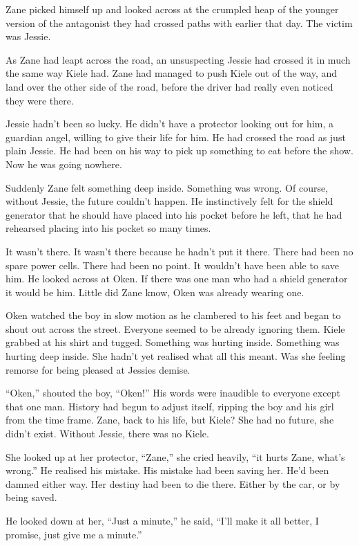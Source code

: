 Zane picked himself up and looked across at the crumpled heap of the younger version of the antagonist they had crossed paths with earlier that day.  The victim was Jessie.

As Zane had leapt across the road, an unsuspecting Jessie had crossed it in much the same way Kiele had.  Zane had managed to push Kiele out of the way, and land over the other side of the road, before the driver had really even noticed they were there.

Jessie hadn't been so lucky.  He didn't have a protector looking out for him, a guardian angel, willing to give their life for him.  He had crossed the road as just plain Jessie.  He had been on his way to pick up something to eat before the show.  Now he was going nowhere.  

Suddenly Zane felt something deep inside.  Something was wrong.  Of course, without Jessie, the future couldn't happen.  He instinctively felt for the shield generator that he should have placed into his pocket before he left, that he had rehearsed placing into his pocket so many times.  

It wasn't there.  It wasn't there because he hadn't put it there.  There had been no spare power cells.  There had been no point.  It wouldn't have been able to save him.  He looked across at Oken.  If there was one man who had a shield generator it would be him.  Little did Zane know, Oken was already wearing one.  

Oken watched the boy in slow motion as he clambered to his feet and began to shout out across the street.  Everyone seemed to be already ignoring them.  Kiele grabbed at his shirt and tugged.  Something was hurting inside.  Something was hurting deep inside.  She hadn't yet realised what all this meant.  Was she feeling remorse for being pleased at Jessies demise.

``Oken,'' shouted the boy, ``Oken!''  His words were inaudible to everyone except that one man.  History had begun to adjust itself, ripping the boy and his girl from the time frame.  Zane, back to his life, but Kiele?  She had no future, she didn't exist.  Without Jessie, there was no Kiele.  

She looked up at her protector, ``Zane,'' she cried heavily, ``it hurts Zane, what's wrong.''  He realised his mistake.  His mistake had been saving her.  He'd been damned either way.  Her destiny had been to die there.  Either by the car, or by being saved.  

He looked down at her, ``Just a minute,'' he said, ``I'll make it all better, I promise, just give me a minute.''

